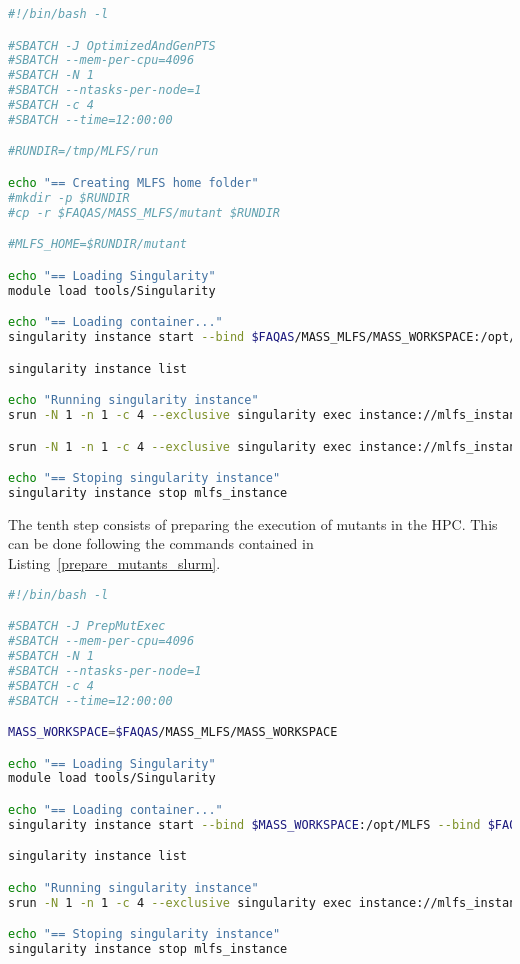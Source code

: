\begin{lstlisting}[language=bash, label=post_compile_slurm ,caption=Example of the SLURM launcher for OptimizedPostProcessing and GeneratePTS steps.]
#!/bin/bash -l

#SBATCH -J OptimizedAndGenPTS
#SBATCH --mem-per-cpu=4096
#SBATCH -N 1
#SBATCH --ntasks-per-node=1
#SBATCH -c 4
#SBATCH --time=12:00:00

#RUNDIR=/tmp/MLFS/run

echo "== Creating MLFS home folder"
#mkdir -p $RUNDIR
#cp -r $FAQAS/MASS_MLFS/mutant $RUNDIR

#MLFS_HOME=$RUNDIR/mutant

echo "== Loading Singularity"
module load tools/Singularity

echo "== Loading container..."
singularity instance start --bind $FAQAS/MASS_MLFS/MASS_WORKSPACE:/opt/MLFS --bind $FAQAS/srcirorfaqas:/opt/srcirorfaqas $FAQAS/MASS_MLFS/blts.sif mlfs_instance

singularity instance list

echo "Running singularity instance"
srun -N 1 -n 1 -c 4 --exclusive singularity exec instance://mlfs_instance /bin/bash /opt/MLFS/OptimizedPostProcessing.sh

srun -N 1 -n 1 -c 4 --exclusive singularity exec instance://mlfs_instance /bin/bash /opt/MLFS/GeneratePTS.sh

echo "== Stoping singularity instance"
singularity instance stop mlfs_instance
\end{lstlisting}

The tenth step consists of preparing the execution of mutants in the HPC. This can be done following the commands contained in Listing~\ref{prepare_mutants_slurm}.

\begin{lstlisting}[language=bash, label=prepare_mutants_slurm ,caption=Example of the SLURM launcher for preparing mutants for its execution on the HPC.]
#!/bin/bash -l

#SBATCH -J PrepMutExec
#SBATCH --mem-per-cpu=4096
#SBATCH -N 1
#SBATCH --ntasks-per-node=1
#SBATCH -c 4
#SBATCH --time=12:00:00

MASS_WORKSPACE=$FAQAS/MASS_MLFS/MASS_WORKSPACE

echo "== Loading Singularity"
module load tools/Singularity

echo "== Loading container..."
singularity instance start --bind $MASS_WORKSPACE:/opt/MLFS --bind $FAQAS/srcirorfaqas:/opt/srcirorfaqas $FAQAS/MASS_MLFS/blts.sif mlfs_instance

singularity instance list

echo "Running singularity instance"
srun -N 1 -n 1 -c 4 --exclusive singularity exec instance://mlfs_instance /bin/bash /opt/MLFS/PrepareMutants_HPC.sh

echo "== Stoping singularity instance"
singularity instance stop mlfs_instance
\end{lstlisting}

